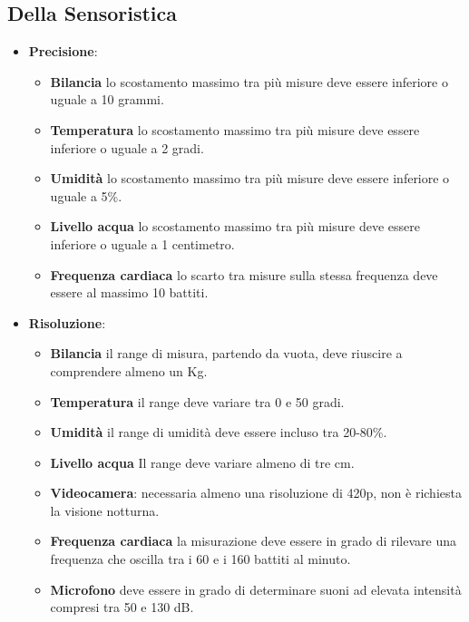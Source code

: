     \subsection{Della Sensoristica}
    \begin{itemize}
        \item \textbf{Precisione}:
            \begin{itemize}
                \item \textbf{Bilancia} lo scostamento massimo tra più misure deve essere inferiore o uguale a 10 grammi.
                \item \textbf{Temperatura} lo scostamento massimo tra più misure deve essere inferiore o uguale a 2 gradi.
                \item \textbf{Umidità} lo scostamento massimo tra più misure deve essere inferiore o uguale a 5\%.
                \item \textbf{Livello acqua} lo scostamento massimo tra più misure deve essere inferiore o uguale a 1 centimetro.
                \item \textbf{Frequenza cardiaca} lo scarto tra misure sulla stessa frequenza deve essere al massimo 10 battiti.
            \end{itemize}
        \item \textbf{Risoluzione}:
            \begin{itemize}
                \item \textbf{Bilancia} il range di misura, partendo da vuota, deve riuscire a comprendere almeno un Kg.
                \item \textbf{Temperatura} il range deve variare tra 0 e 50 gradi. %
                \item \textbf{Umidità} il range di umidità deve essere incluso tra 20-80\%.
                \item \textbf{Livello acqua} Il range deve variare almeno di tre cm. 
                \item \textbf{Videocamera}: necessaria almeno una risoluzione di 420p, non è richiesta la visione notturna. 
                \item \textbf{Frequenza cardiaca} la misurazione deve essere in grado di rilevare una frequenza che oscilla tra i 60 e i 160 battiti al minuto. 
                \item \textbf{Microfono} deve essere in grado di determinare suoni ad elevata intensità compresi tra 50 e 130 dB. 

\end{itemize}
\end{itemize}
